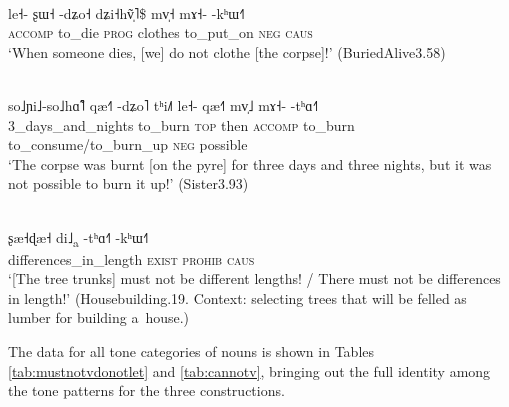 \begin{exe}
  \ex
  \label{ex:whensomeonediesdonotclothe}
  \\
  \gll le˧-	ʂɯ˧	-dʑo˧	dʑi˧hṽ̩˥\$	mv̩˧		mɤ˧-	-kʰɯ˧˥\\
  \textsc{accomp}	to\_die	\textsc{prog}	clothes	to\_put\_on	\textsc{neg}	\textsc{caus}\\
  \glt ‘When someone dies, [we] do not clothe [the corpse]!’ (BuriedAlive3.58)

  \ex
  \label{ex:burncorpse}
  \\
  \gll so˩ɲi˩-so˩hɑ̃˥	qæ˧˥	-dʑo˥	tʰi˩˥	le˧-		qæ˧˥	 mv̩˩			mɤ˧-	-tʰɑ˧˥\\
  3\_days\_and\_nights	to\_burn	\textsc{top}	then	\textsc{accomp}	to\_burn to\_consume/to\_burn\_up
  \textsc{neg}	possible\\
  \glt ‘The corpse was burnt [on the pyre] for three days and three nights, but it was not possible
  to burn it up!’ (Sister3.93)

  \ex
  \label{ex:difflength}
  \\
  \gll ʂæ˧ɖæ˧ di˩\textsubscript{a}	-tʰɑ˧˥	-kʰɯ˧˥\\
  differences\_in\_length		\textsc{exist}	\textsc{prohib}	\textsc{caus}\\
  \glt ‘[The tree trunks] must not be different lengths! / There must not be differences in length!’ (Housebuilding.19. Context: selecting trees that will be felled as lumber for building a~house.)

\end{exe}

The data for all tone categories of nouns is shown in Tables \ref{tab:mustnotvdonotlet} and  \ref{tab:cannotv}, bringing out the full identity among the tone patterns for the three constructions.

